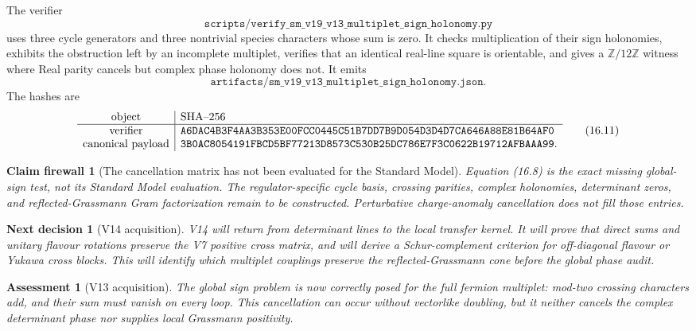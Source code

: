 \documentclass[11pt]{article}
\newtheorem{firewall}[theorem]{Claim firewall}
\newtheorem{decision}[theorem]{Next decision}
\newtheorem{assessment}[theorem]{Assessment}
\theoremstyle{remark}
\begin{document}
The verifier
\[
 \texttt{scripts/verify\_sm\_v19\_v13\_multiplet\_sign\_holonomy.py}
                                                                  \tag{16.9}
\]
uses three cycle generators and three nontrivial species characters whose
sum is zero.  It checks multiplication of their sign holonomies, exhibits
the obstruction left by an incomplete multiplet, verifies that an
identical real-line square is orientable, and gives a
\(\mathbb Z/12\mathbb Z\) witness where Real parity cancels but complex
phase holonomy does not.  It emits
\[
 \texttt{artifacts/sm\_v19\_v13\_multiplet\_sign\_holonomy.json}.
                                                                  \tag{16.10}
\]
The hashes are
\[
\begin{array}{c|l}
\hbox{object}&\hbox{SHA--256}\\ \hline
\hbox{verifier}&
\texttt{A6DAC4B3F4AA3B353E00FCC0445C51B7DD7B9D054D3D4D7CA646A88E81B64AF0}\\
\hbox{canonical payload}&
\texttt{3B0AC8054191FBCD5BF77213D8573C530B25DC786E7F3C0622B19712AFBAAA99}.
\end{array}                                                     \tag{16.11}
\]

\begin{firewall}[The cancellation matrix has not been evaluated for the Standard Model]
\label{fire:v19v13}
Equation (16.8) is the exact missing global-sign test, not its Standard
Model evaluation.  The regulator-specific cycle basis, crossing parities,
complex holonomies, determinant zeros, and reflected-Grassmann Gram
factorization remain to be constructed.  Perturbative charge-anomaly
cancellation does not fill those entries.
\end{firewall}

\begin{decision}[V14 acquisition]
\label{dec:v19v13-next}
V14 will return from determinant lines to the local transfer kernel.  It
will prove that direct sums and unitary flavour rotations preserve the V7
positive cross matrix, and will derive a Schur-complement criterion for
off-diagonal flavour or Yukawa cross blocks.  This will identify which
multiplet couplings preserve the reflected-Grassmann cone before the
global phase audit.
\end{decision}

\begin{assessment}[V13 acquisition]
\label{ass:v19v13}
The global sign problem is now correctly posed for the full fermion
multiplet: mod-two crossing characters add, and their sum must vanish on
every loop.  This cancellation can occur without vectorlike doubling, but
it neither cancels the complex determinant phase nor supplies local
Grassmann positivity.
\end{assessment}
\end{document}
